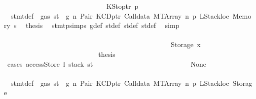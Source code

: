 \begin{isabellebody}
\isanewline
\ \ \ \ \ \ \ \ \ \ \ \ \ \ \ \ \ \ \ \ \ \ \ \ \ \ \ \ \isamarkupfalse%
\ {\isacharparenleft}{\kern0pt}KStoptr\ p{\isacharprime}{\kern0pt}{\isacharparenright}{\kern0pt}\isanewline
\ \ \ \ \ \ \ \ \ \ \ \ \ \ \ \ \ \ \ \ \ \ \ \ \ \ \ \ \isamarkupfalse%
\ {}{\isacharparenleft}{\kern0pt}{}{\isacharparenright}{\kern0pt}\ stmt{\isacharunderscore}{\kern0pt}def\ {\isacharbackquoteopen}{\isasymnot}\ gas\ st\ {\isasymle}\ g{\isacharbackquoteclose}\ n\ Pair\ KCDptr\ Calldata\ MTArray\ n{}\ p{}\ LStackloc\ Memory\ s{}\ \isamarkupfalse%
\ {\isacharquery}{\kern0pt}thesis\ \isamarkupfalse%
\ stmt{\isachardot}{\kern0pt}psimps{\isacharparenleft}{\kern0pt}{}{\isacharparenright}{\kern0pt}\ g{\isacharunderscore}{\kern0pt}def\ st{\isacharprime}{\kern0pt}{\isacharunderscore}{\kern0pt}def\ st{\isacharprime}{\kern0pt}{\isacharprime}{\kern0pt}{\isacharunderscore}{\kern0pt}def\ st{\isacharprime}{\kern0pt}{\isacharprime}{\kern0pt}{\isacharprime}{\kern0pt}{\isacharunderscore}{\kern0pt}def\ \isamarkupfalse%
\ simp\isanewline
\ \ \ \ \ \ \ \ \ \ \ \ \ \ \ \ \ \ \ \ \ \ \ \ \ \ \isamarkupfalse%
\isanewline
\ \ \ \ \ \ \ \ \ \ \ \ \ \ \ \ \ \ \ \ \ \ \ \ \isamarkupfalse%
\isanewline
\ \ \ \ \ \ \ \ \ \ \ \ \ \ \ \ \ \ \ \ \ \ \isamarkupfalse%
\isanewline
\ \ \ \ \ \ \ \ \ \ \ \ \ \ \ \ \ \ \ \ \ \ \ \ \isamarkupfalse%
\ {\isacharparenleft}{\kern0pt}Storage\ x{}{\isacharparenright}{\kern0pt}\isanewline
\ \ \ \ \ \ \ \ \ \ \ \ \ \ \ \ \ \ \ \ \ \ \ \ \isamarkupfalse%
\ \isamarkupfalse%
\ {\isacharquery}{\kern0pt}thesis\isanewline
\ \ \ \ \ \ \ \ \ \ \ \ \ \ \ \ \ \ \ \ \ \ \ \ \isamarkupfalse%
\ {\isacharparenleft}{\kern0pt}cases\ {\isachardoublequoteopen}accessStore\ l\ {\isacharparenleft}{\kern0pt}stack\ st{\isacharprime}{\kern0pt}{\isacharprime}{\kern0pt}{\isacharparenright}{\kern0pt}{\isachardoublequoteclose}{\isacharparenright}{\kern0pt}\isanewline
\ \ \ \ \ \ \ \ \ \ \ \ \ \ \ \ \ \ \ \ \ \ \ \ \ \ \isamarkupfalse%
\ None\isanewline
\ \ \ \ \ \ \ \ \ \ \ \ \ \ \ \ \ \ \ \ \ \ \ \ \ \ \isamarkupfalse%
\ {}{\isacharparenleft}{\kern0pt}{}{\isacharparenright}{\kern0pt}\ stmt{\isacharunderscore}{\kern0pt}def\ {\isacharbackquoteopen}{\isasymnot}\ gas\ st\ {\isasymle}\ g{\isacharbackquoteclose}\ n\ Pair\ KCDptr\ Calldata\ MTArray\ n{}\ p{}\ LStackloc\ Storage\ \isamarkupfalse%

\end{isabellebody}
